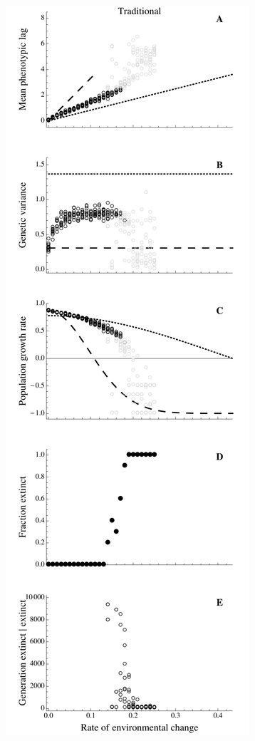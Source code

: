 \documentclass[12pt,letterpaper]{article} %
\begin{document}
\thispagestyle{empty}


\setcounter{figure}{1}
\begin{figure}[!ht]
\centering
\includegraphics[width=0.45\linewidth]{IMAGES/TradSummaryMeanLargeBurn}

\end{figure}
\end{document}
